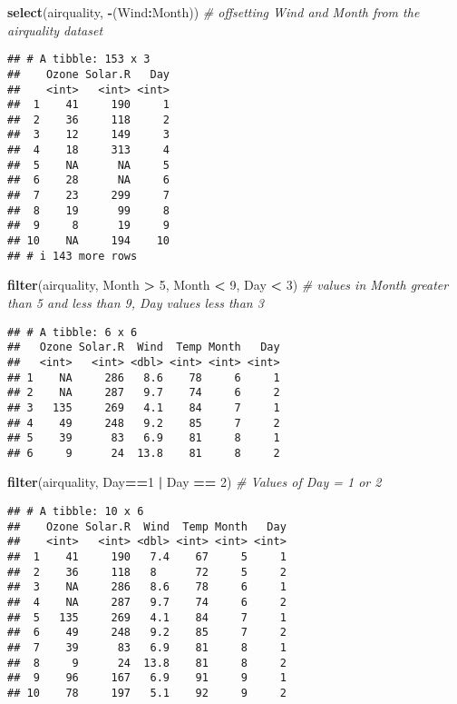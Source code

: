 \documentclass[
]{article}
\newenvironment{Shaded}{\begin{snugshade}}{\end{snugshade}}
\newcommand{\CommentTok}[1]{\textcolor[rgb]{0.56,0.35,0.01}{\textit{#1}}}
\newcommand{\DecValTok}[1]{\textcolor[rgb]{0.00,0.00,0.81}{#1}}
\newcommand{\FunctionTok}[1]{\textcolor[rgb]{0.13,0.29,0.53}{\textbf{#1}}}
\newcommand{\NormalTok}[1]{#1}
\newcommand{\SpecialCharTok}[1]{\textcolor[rgb]{0.81,0.36,0.00}{\textbf{#1}}}
\begin{document}
\begin{Shaded}
\begin{Highlighting}[]
\FunctionTok{select}\NormalTok{(airquality, }\SpecialCharTok{{-}}\NormalTok{(Wind}\SpecialCharTok{:}\NormalTok{Month)) }\CommentTok{\# offsetting Wind and Month from the airquality dataset}
\end{Highlighting}
\end{Shaded}

\begin{verbatim}
## # A tibble: 153 x 3
##    Ozone Solar.R   Day
##    <int>   <int> <int>
##  1    41     190     1
##  2    36     118     2
##  3    12     149     3
##  4    18     313     4
##  5    NA      NA     5
##  6    28      NA     6
##  7    23     299     7
##  8    19      99     8
##  9     8      19     9
## 10    NA     194    10
## # i 143 more rows
\end{verbatim}

\begin{Shaded}
\begin{Highlighting}[]
\FunctionTok{filter}\NormalTok{(airquality, Month }\SpecialCharTok{\textgreater{}} \DecValTok{5}\NormalTok{, Month }\SpecialCharTok{\textless{}} \DecValTok{9}\NormalTok{, Day }\SpecialCharTok{\textless{}} \DecValTok{3}\NormalTok{) }\CommentTok{\# values in Month greater than 5 and less than 9, Day values less than 3}
\end{Highlighting}
\end{Shaded}

\begin{verbatim}
## # A tibble: 6 x 6
##   Ozone Solar.R  Wind  Temp Month   Day
##   <int>   <int> <dbl> <int> <int> <int>
## 1    NA     286   8.6    78     6     1
## 2    NA     287   9.7    74     6     2
## 3   135     269   4.1    84     7     1
## 4    49     248   9.2    85     7     2
## 5    39      83   6.9    81     8     1
## 6     9      24  13.8    81     8     2
\end{verbatim}

\begin{Shaded}
\begin{Highlighting}[]
\FunctionTok{filter}\NormalTok{(airquality, Day}\SpecialCharTok{==}\DecValTok{1} \SpecialCharTok{|}\NormalTok{ Day }\SpecialCharTok{==} \DecValTok{2}\NormalTok{) }\CommentTok{\# Values of Day = 1 or 2}
\end{Highlighting}
\end{Shaded}

\begin{verbatim}
## # A tibble: 10 x 6
##    Ozone Solar.R  Wind  Temp Month   Day
##    <int>   <int> <dbl> <int> <int> <int>
##  1    41     190   7.4    67     5     1
##  2    36     118   8      72     5     2
##  3    NA     286   8.6    78     6     1
##  4    NA     287   9.7    74     6     2
##  5   135     269   4.1    84     7     1
##  6    49     248   9.2    85     7     2
##  7    39      83   6.9    81     8     1
##  8     9      24  13.8    81     8     2
##  9    96     167   6.9    91     9     1
## 10    78     197   5.1    92     9     2
\end{verbatim}
\end{document}
